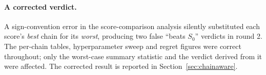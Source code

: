 \documentclass[11pt,a4paper]{article}
\begin{document}
\paragraph{A corrected verdict.} A sign-convention error in the score-comparison
analysis silently substituted each score's \emph{best} chain for its
\emph{worst}, producing two false ``beats $S_0$'' verdicts in round 2. The
per-chain tables, hyperparameter sweep and regret figures were correct
throughout; only the worst-case summary statistic and the verdict derived
from it were affected. The corrected result is reported in
Section~\ref{sec:chainaware}.
\end{document}

